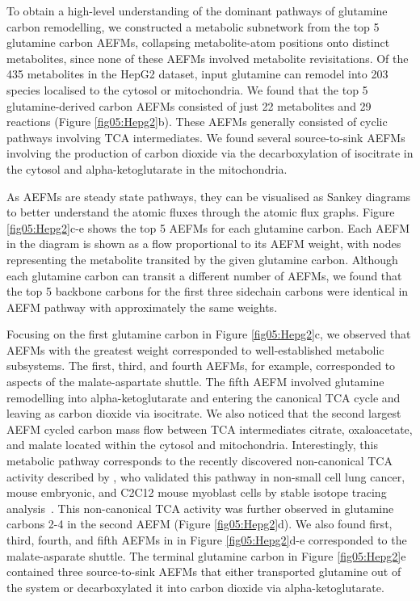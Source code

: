 \documentclass[12pt]{article}
\begin{document}
To obtain a high-level understanding of the dominant pathways of glutamine
carbon remodelling, we constructed a metabolic subnetwork from the top
5 glutamine carbon AEFMs, collapsing metabolite-atom positions onto
distinct metabolites, since none of these AEFMs involved metabolite
revisitations. Of the 435 metabolites in the HepG2 dataset, input
glutamine can remodel into 203 species localised to the cytosol or
mitochondria. We found that the top 5 glutamine-derived carbon AEFMs
consisted of just 22 metabolites and 29 reactions (Figure
\ref{fig05:Hepg2}b). These AEFMs generally consisted of cyclic pathways
involving TCA intermediates. We found several source-to-sink AEFMs
involving the production of carbon dioxide via the decarboxylation of
isocitrate in the cytosol and alpha-ketoglutarate in the mitochondria.

As AEFMs are steady state pathways, they can be visualised as Sankey
diagrams to better understand the atomic fluxes through the atomic flux
graphs. Figure \ref{fig05:Hepg2}c-e shows the top 5 AEFMs for each
glutamine carbon. Each AEFM in the diagram is shown as a flow proportional
to its AEFM weight, with nodes representing the metabolite transited by
the given glutamine carbon. Although each glutamine carbon can transit
a different number of AEFMs, we found that the top 5 backbone carbons for
the first three sidechain carbons were identical in AEFM pathway with
approximately the same weights.

Focusing on the first glutamine carbon in Figure \ref{fig05:Hepg2}c, we
observed that AEFMs with the greatest weight corresponded to
well-established metabolic subsystems. The first, third, and fourth AEFMs,
for example, corresponded to aspects of the malate-aspartate shuttle. The
fifth AEFM involved glutamine remodelling into alpha-ketoglutarate and
entering the canonical TCA cycle and leaving as carbon dioxide via
isocitrate. We also noticed that the second largest AEFM cycled carbon
mass flow between TCA intermediates citrate, oxaloacetate, and malate
located within the cytosol and mitochondria. Interestingly, this
metabolic pathway corresponds to the recently discovered non-canonical TCA
activity described by \citeauthor{ArnoldPaigeK2022Anta}, who validated
this pathway in non-small cell lung cancer, mouse embryonic, and C2C12
mouse myoblast cells by stable isotope tracing
analysis~\citep{ArnoldPaigeK2022Anta}. This non-canonical TCA activity was
further observed in glutamine carbons 2-4 in the second AEFM (Figure
\ref{fig05:Hepg2}d). We also found first, third, fourth, and fifth AEFMs
in in Figure \ref{fig05:Hepg2}d-e corresponded to the malate-asparate
shuttle. The terminal glutamine carbon in Figure \ref{fig05:Hepg2}e
contained three source-to-sink AEFMs that either transported glutamine out
of the system or decarboxylated it into carbon dioxide via
alpha-ketoglutarate.
\end{document}

